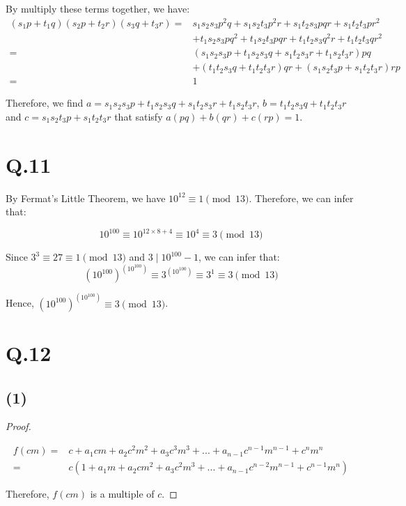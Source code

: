 \documentclass[a4paper,12pt]{article}
\begin{document}
By multiply these terms together, we have:
\begin{align*}
	(s_1 p + t_1 q) (s_2 p + t_2 r) (s_3 q + t_3 r) =& s_1 s_2 s_3 p^2q + s_1 s_2 t_3 p^2r + s_1 t_2 s_3 pqr + s_1 t_2 t_3 pr^2 \\
	 &+ t_1 s_2 s_3 pq^2 + t_1 s_2 t_3 pqr + t_1 t_2 s_3 q^2r + t_1 t_2 t_3 qr^2 \\
	=& (s_1 s_2 s_3 p + t_1 s_2 s_3 q + s_1 t_2 s_3 r + t_1 s_2 t_3 r) pq \\ 
	 &+ (t_1 t_2 s_3 q + t_1 t_2 t_3 r) qr + (s_1 s_2 t_3 p + s_1 t_2 t_3 r) rp \\
	=& 1
\end{align*}

Therefore, we find $a = s_1 s_2 s_3 p + t_1 s_2 s_3 q + s_1 t_2 s_3 r + t_1 s_2 t_3 r$, $b = t_1 t_2 s_3 q + t_1 t_2 t_3 r$ and $c = s_1 s_2 t_3 p + s_1 t_2 t_3 r$ that satisfy $a(pq) + b(qr) + c(rp) = 1$.

\section*{Q.11}

By Fermat's Little Theorem, we have $10^{12} \equiv 1 \pmod{13}$.
Therefore, we can infer that:

\begin{equation*}
	10^{100} \equiv 10^{12 \times 8 + 4} \equiv 10^4 \equiv 3 \pmod{13}
\end{equation*}

Since $3^3 \equiv 27 \equiv 1 \pmod{13}$ and $3 \mid 10^{100} - 1$, we can infer that:
\begin{equation*}
	(10^{100})^{(10^{100})} \equiv 3^{(10^{100})} \equiv 3^1 \equiv 3 \pmod{13}
\end{equation*}

Hence, $(10^{100})^{(10^{100})} \equiv 3 \pmod{13}$.

\section*{Q.12}

\subsection*{(1)}

\begin{proof}
$ $

\begin{align*}
	f(cm) =& c + a_1 cm + a_2 c^2 m^2 + a_3 c^3 m^3 + ... + a_{n-1} c^{n-1} m^{n-1} + c^n m^n \\
	=& c (1 + a_1 m + a_2 c m^2 + a_3 c^2 m^3 + ... + a_{n-1} c^{n-2} m^{n-1} + c^{n-1} m^n)
\end{align*}

Therefore, $f(cm)$ is a multiple of $c$.
\end{proof}
\end{document}
